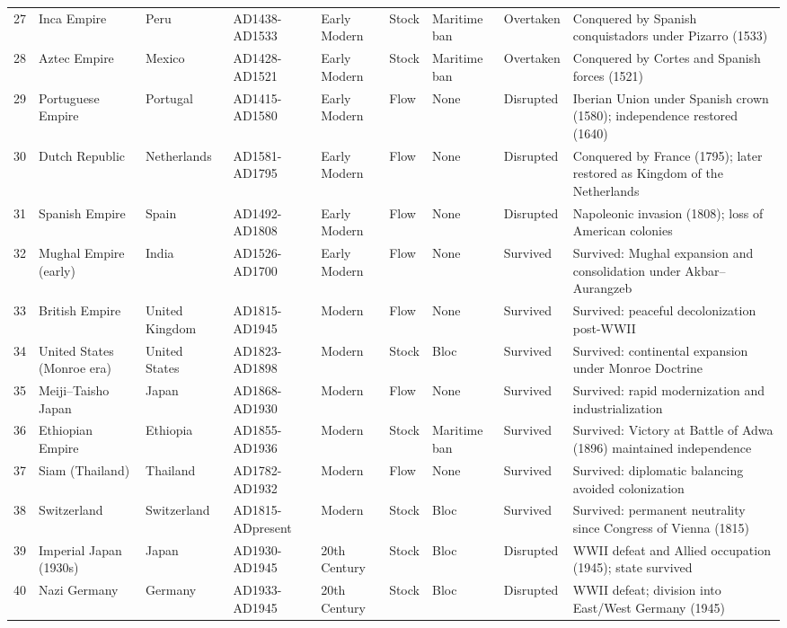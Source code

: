 \documentclass[11pt]{article}
\begin{document}
\begin{longtable}{rlllllllp{6cm}}
27 & Inca Empire & Peru & AD1438-AD1533 & Early Modern & Stock & Maritime ban & Overtaken & Conquered by Spanish conquistadors under Pizarro (1533) \\
28 & Aztec Empire & Mexico & AD1428-AD1521 & Early Modern & Stock & Maritime ban & Overtaken & Conquered by Cortes and Spanish forces (1521) \\
29 & Portuguese Empire & Portugal & AD1415-AD1580 & Early Modern & Flow & None & Disrupted & Iberian Union under Spanish crown (1580); independence restored (1640) \\
30 & Dutch Republic & Netherlands & AD1581-AD1795 & Early Modern & Flow & None & Disrupted & Conquered by France (1795); later restored as Kingdom of the Netherlands \\
31 & Spanish Empire & Spain & AD1492-AD1808 & Early Modern & Flow & None & Disrupted & Napoleonic invasion (1808); loss of American colonies \\
32 & Mughal Empire (early) & India & AD1526-AD1700 & Early Modern & Flow & None & Survived & Survived: Mughal expansion and consolidation under Akbar--Aurangzeb \\
33 & British Empire & United Kingdom & AD1815-AD1945 & Modern & Flow & None & Survived & Survived: peaceful decolonization post-WWII \\
34 & United States (Monroe era) & United States & AD1823-AD1898 & Modern & Stock & Bloc & Survived & Survived: continental expansion under Monroe Doctrine \\
35 & Meiji--Taisho Japan & Japan & AD1868-AD1930 & Modern & Flow & None & Survived & Survived: rapid modernization and industrialization \\
36 & Ethiopian Empire & Ethiopia & AD1855-AD1936 & Modern & Stock & Maritime ban & Survived & Survived: Victory at Battle of Adwa (1896) maintained independence \\
37 & Siam (Thailand) & Thailand & AD1782-AD1932 & Modern & Flow & None & Survived & Survived: diplomatic balancing avoided colonization \\
38 & Switzerland & Switzerland & AD1815-ADpresent & Modern & Stock & Bloc & Survived & Survived: permanent neutrality since Congress of Vienna (1815) \\
39 & Imperial Japan (1930s) & Japan & AD1930-AD1945 & 20th Century & Stock & Bloc & Disrupted & WWII defeat and Allied occupation (1945); state survived \\
40 & Nazi Germany & Germany & AD1933-AD1945 & 20th Century & Stock & Bloc & Disrupted & WWII defeat; division into East/West Germany (1945) \\

\end{longtable}
\end{document}
